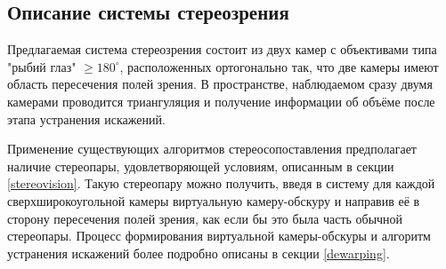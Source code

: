 \subsection{Описание системы стереозрения}

Предлагаемая система стереозрения состоит из двух камер с объективами типа "рыбий глаз" $\geqslant180^\circ$,
расположенных ортогонально так, что  две камеры имеют область пересечения полей зрения. В пространстве, наблюдаемом 
сразу  двумя камерами проводится триангуляция и получение информации об объёме после этапа устранения искажений.  %

 


Применение существующих алгоритмов стереосопоставления предполагает наличие стереопары, удовлетворяющей условиям, описанным в секции \ref{stereovision}.
Такую стереопару можно получить, введя в систему  для каждой сверхширокоугольной камеры виртуальную камеру-обскуру и направив 
её в сторону пересечения полей зрения, как если бы это была часть обычной стереопары. Процесс формирования виртуальной камеры-обскуры и 
алгоритм устранения искажений более подробно описаны в секции \ref{dewarping}.

